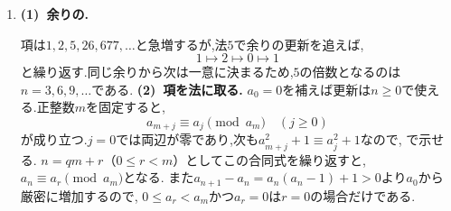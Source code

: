 \begin{enumerate}[label=\textbf{問\arabic*.},leftmargin=3.8em,format=\bookitemlink{practice-entrance}{solution}{problem}]
                  復路では最小の札$1$がその部分の左端へ移るため,最後の比較直前には
                  $(2,1,D_2,\ldots,D_{n-1})$となる.
                  最後の$(2,1)$を交換すれば,元の成否と縮約先の成否が一致する.
                  逆に,先頭が$1$でない成功配置で数字$2$以上を$1$増やし,先頭に$2$を戻せば一意に復元できる.
                  先頭が$1$の成功配置は\textcircled{1}の対応から$c_{n-2}$通りなので,
                  \textcircled{3}は$c_{n-1}-c_{n-2}$通りとなる.
                  \par\textbf{\textcircled{4}の数え方.}
                  最初の二枚を交換すれば\textcircled{3}に一対一で対応し,最初の比較後は同じ配列になる.
                  よってこちらも$c_{n-1}-c_{n-2}$通りであり,
                  \[
                    c_n=2c_{n-1}+2(c_{n-1}-c_{n-2})
                       =4c_{n-1}-2c_{n-2}.
                  \]
                  引いた$c_{n-2}$は,\textcircled{3}の縮約先から除く「先頭が$1$の配置」の数である.
                  \smallskip\textbf{(3)~個数から3項型へ.}
                  $x^2-4x+2=0$の根は$2\pm\sqrt2$である.
                  \[
                    c_n=P(2+\sqrt2)^{n-1}+Q(2-\sqrt2)^{n-1}
                  \]
                  に$c_1=1,c_2=2$を入れると$P=Q=\dfrac{1}{2}$であり,解答の式を得る.
                  $c_4=20,c_5=68$となる.二つのべきで$\sqrt2$の奇数次の項が相殺され,個数は整数になる.
                  この問の中心は,解く前の「何を取り除き,どう戻すか」という設計にある.
          \item \textbf{(1)~余りの.}\par\nobreak
                  項は$1,2,5,26,677,\ldots$と急増するが,法$5$で余りの更新を追えば,
                  \[
                    1\longmapsto2\longmapsto0\longmapsto1
                  \]
                  と繰り返す.同じ余りから次は一意に決まるため,$5$の倍数となるのは$n=3,6,9,\ldots$である.
                  \smallskip\textbf{(2)~項を法に取る.}
                  $a_0=0$を補えば更新は$n\ge0$で使える.正整数$m$を固定すると,
                  \[
                    a_{m+j}\equiv a_j\pmod{a_m}\quad(j\ge0)
                  \]
                  が成り立つ.$j=0$では両辺が零であり,次も$a_{m+j}^2+1\equiv a_j^2+1$なので,
                  で示せる.
                  $n=qm+r$（$0\le r<m$）としてこの合同式を繰り返すと,
                  $a_n\equiv a_r\pmod{a_m}$となる.
                  また$a_{n+1}-a_n=a_n(a_n-1)+1>0$より$a_0$から厳密に増加するので,
                  $0\le a_r<a_m$かつ$a_r=0$は$r=0$の場合だけである.

\end{enumerate}
